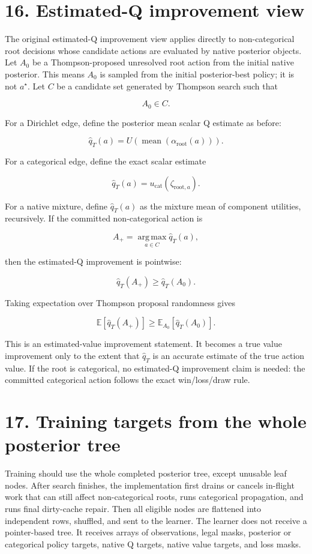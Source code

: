 \documentclass[11pt]{article}
\newcommand{\E}{\mathbb{E}}
\newcommand{\argmax}{\operatorname*{arg\,max}}
\newcommand{\mean}{\operatorname{mean}}
\newcommand{\Utility}{U}
\newcommand{\OutcomeUtility}{u_{\mathrm{cat}}}
\begin{document}
\section*{16. Estimated-Q improvement view}

The original estimated-Q improvement view applies directly to non-categorical
root decisions whose candidate actions are evaluated by native posterior
objects. Let \(A_0\) be a Thompson-proposed unresolved root action from the
initial native posterior. This means \(A_0\) is sampled from the initial
posterior-best policy; it is not \(a^\star\). Let \(C\) be a candidate set
generated by Thompson search such that

\[
A_0 \in C.
\]

For a Dirichlet edge, define the posterior mean scalar Q estimate as before:

\[
\hat{q}_T(a)
=
\Utility
\left(
\mean
\left(
\alpha_{\mathrm{root}}(a)
\right)
\right).
\]

For a categorical edge, define the exact scalar estimate

\[
\hat q_T(a)=\OutcomeUtility(\zeta_{\mathrm{root},a}).
\]

For a native mixture, define \(\hat q_T(a)\) as the mixture mean of component
utilities, recursively. If the committed non-categorical action is

\[
A_+
=
\argmax_{a\in C}
\hat{q}_T(a),
\]

then the estimated-Q improvement is pointwise:

\[
\hat{q}_T(A_+)
\ge
\hat{q}_T(A_0).
\]

Taking expectation over Thompson proposal randomness gives

\[
\E
\left[
\hat{q}_T(A_+)
\right]
\ge
\E_{A_0}
\left[
\hat{q}_T(A_0)
\right].
\]

This is an estimated-value improvement statement. It becomes a true value
improvement only to the extent that \(\hat{q}_T\) is an accurate estimate of the
true action value. If the root is categorical, no estimated-Q improvement claim
is needed: the committed categorical action follows the exact win/loss/draw rule.

\section*{17. Training targets from the whole posterior tree}

Training should use the whole completed posterior tree, except unusable leaf
nodes. After search finishes, the implementation first drains or cancels
in-flight work that can still affect non-categorical roots, runs categorical
propagation, and runs final dirty-cache repair. Then all eligible nodes are
flattened into independent rows, shuffled, and sent to the learner. The learner
does not receive a pointer-based tree. It receives arrays of observations, legal
masks, posterior or categorical policy targets, native Q targets, native value
targets, and loss masks.
\end{document}
